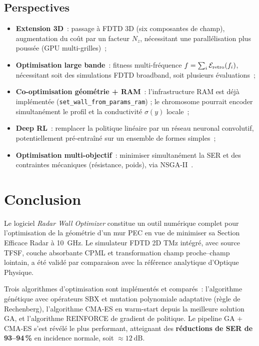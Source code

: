 \documentclass[12pt,a4paper]{article}
\begin{document}
\subsection{Perspectives}

\begin{itemize}
    \item \textbf{Extension 3D}~: passage à FDTD 3D (six composantes de champ),
          augmentation du coût par un facteur $N_z$, nécessitant une parallélisation
          plus poussée (GPU multi-grilles)~;
    \item \textbf{Optimisation large bande}~: fitness multi-fréquence
          $f = \sum_i \mathcal{E}_{\rm retro}(f_i)$, nécessitant soit des simulations
          FDTD broadband, soit plusieurs évaluations~;
    \item \textbf{Co-optimisation géométrie + RAM}~: l'infrastructure RAM est déjà
          implémentée (\texttt{set\_wall\_from\_params\_ram}) ; le chromosome pourrait
          encoder simultanément le profil et la conductivité $\sigma(y)$ locale~;
    \item \textbf{Deep RL}~: remplacer la politique linéaire par un réseau neuronal
          convolutif, potentiellement pré-entraîné sur un ensemble de formes simples~;
    \item \textbf{Optimisation multi-objectif}~: minimiser simultanément la SER et
          des contraintes mécaniques (résistance, poids), via NSGA-II~\cite{Deb2002}.
\end{itemize}

\section{Conclusion}
\label{sec:conclusion}

Le logiciel \textit{Radar Wall Optimizer} constitue un outil numérique complet
pour l'optimisation de la géométrie d'un mur PEC en vue de minimiser sa Section
Efficace Radar à \SI{10}{\giga\hertz}. Le simulateur FDTD 2D TMz intégré, avec
source TFSF, couche absorbante CPML et transformation champ proche--champ lointain,
a été validé par comparaison avec la référence analytique d'Optique Physique.

Trois algorithmes d'optimisation sont implémentés et comparés~: l'algorithme
génétique avec opérateurs SBX et mutation polynomiale adaptative (règle de Rechenberg),
l'algorithme CMA-ES en warm-start depuis la meilleure solution GA, et l'algorithme
REINFORCE de gradient de politique. Le pipeline GA + CMA-ES s'est révélé le plus
performant, atteignant des \textbf{réductions de SER de 93--94\,\%} en incidence
normale, soit $\approx \SI{12}{\dB}$.
\end{document}
